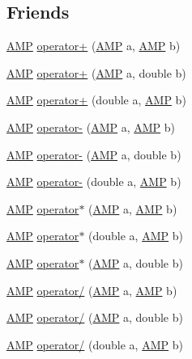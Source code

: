 \subsection*{Friends}
\begin{DoxyCompactItemize}
\item 
\hyperlink{class_a_m_p}{A\+M\+P} \hyperlink{class_a_m_p_a53fa727ddd84247135d8242ca76c0ea5}{operator+} (\hyperlink{class_a_m_p}{A\+M\+P} a, \hyperlink{class_a_m_p}{A\+M\+P} b)
\item 
\hyperlink{class_a_m_p}{A\+M\+P} \hyperlink{class_a_m_p_ab8c006600aac3ca1d268f527fa735601}{operator+} (\hyperlink{class_a_m_p}{A\+M\+P} a, double b)
\item 
\hyperlink{class_a_m_p}{A\+M\+P} \hyperlink{class_a_m_p_a129043da29f3d738404f7677f435d08f}{operator+} (double a, \hyperlink{class_a_m_p}{A\+M\+P} b)
\item 
\hyperlink{class_a_m_p}{A\+M\+P} \hyperlink{class_a_m_p_a9dfbf753a991f63b3bbd4edefeaa09dd}{operator-\/} (\hyperlink{class_a_m_p}{A\+M\+P} a, \hyperlink{class_a_m_p}{A\+M\+P} b)
\item 
\hyperlink{class_a_m_p}{A\+M\+P} \hyperlink{class_a_m_p_a9dd9bc8a7376ca14830562409c00ce9c}{operator-\/} (\hyperlink{class_a_m_p}{A\+M\+P} a, double b)
\item 
\hyperlink{class_a_m_p}{A\+M\+P} \hyperlink{class_a_m_p_aa8ee1d36bd733990bbbba40412e3f554}{operator-\/} (double a, \hyperlink{class_a_m_p}{A\+M\+P} b)
\item 
\hyperlink{class_a_m_p}{A\+M\+P} \hyperlink{class_a_m_p_a9c2c71d0d7012e73cf03b456d95166b4}{operator$\ast$} (\hyperlink{class_a_m_p}{A\+M\+P} a, \hyperlink{class_a_m_p}{A\+M\+P} b)
\item 
\hyperlink{class_a_m_p}{A\+M\+P} \hyperlink{class_a_m_p_acb5225604989f2f4177eaec6b08c5cde}{operator$\ast$} (double a, \hyperlink{class_a_m_p}{A\+M\+P} b)
\item 
\hyperlink{class_a_m_p}{A\+M\+P} \hyperlink{class_a_m_p_a9fc5f153f95cda0dd331590738815acf}{operator$\ast$} (\hyperlink{class_a_m_p}{A\+M\+P} a, double b)
\item 
\hyperlink{class_a_m_p}{A\+M\+P} \hyperlink{class_a_m_p_a09fc3cf3b6ff3f388cfbf730cca9d216}{operator/} (\hyperlink{class_a_m_p}{A\+M\+P} a, \hyperlink{class_a_m_p}{A\+M\+P} b)
\item 
\hyperlink{class_a_m_p}{A\+M\+P} \hyperlink{class_a_m_p_a92ea228fb63190a290a22dd1f61d7084}{operator/} (\hyperlink{class_a_m_p}{A\+M\+P} a, double b)
\item 
\hyperlink{class_a_m_p}{A\+M\+P} \hyperlink{class_a_m_p_a3b58c3a64b532a6460a734b96792ec4a}{operator/} (double a, \hyperlink{class_a_m_p}{A\+M\+P} b)
\end{DoxyCompactItemize}
